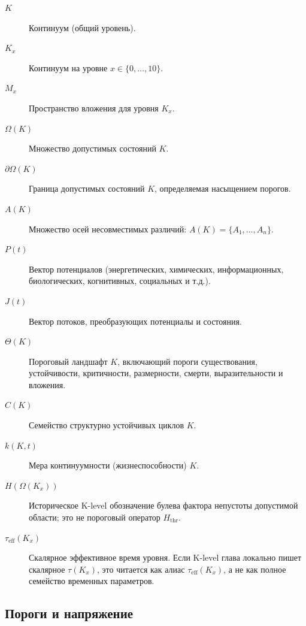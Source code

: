 \begin{description}
  \item[\(K\)] Континуум (общий уровень).
  \item[\(K_x\)] Континуум на уровне \(x\in\{0,\dots,10\}\).
  \item[\(M_x\)] Пространство вложения для уровня \(K_x\).
  \item[\(\Omega(K)\)] Множество допустимых состояний \(K\).
  \item[\(\partial\Omega(K)\)] Граница допустимых состояний \(K\), определяемая
        насыщением порогов.
  \item[\(A(K)\)] Множество осей несовместимых различий:
        \(A(K) = \{A_1,\dots,A_n\}\).
  \item[\(P(t)\)] Вектор потенциалов (энергетических, химических, информационных,
        биологических, когнитивных, социальных и т.д.).
  \item[\(J(t)\)] Вектор потоков, преобразующих потенциалы и состояния.
  \item[\(\Theta(K)\)] Пороговый ландшафт \(K\), включающий пороги существования,
        устойчивости, критичности, размерности, смерти, выразительности и
        вложения.
  \item[\(C(K)\)] Семейство структурно устойчивых циклов \(K\).
  \item[\(k(K,t)\)] Мера континуумности (жизнеспособности) \(K\).
  \item[\(H(\Omega(K_x))\)] Историческое K-level обозначение булева фактора
        непустоты допустимой области; это не пороговый оператор
        \(H_{\mathrm{thr}}\).
  \item[\(\tau_{\mathrm{eff}}(K_x)\)] Скалярное эффективное время уровня.
        Если K-level глава локально пишет скалярное \(\tau(K_x)\), это
        читается как алиас \(\tau_{\mathrm{eff}}(K_x)\), а не как полное
        семейство временных параметров.
\end{description}

\subsection{Пороги и напряжение}

